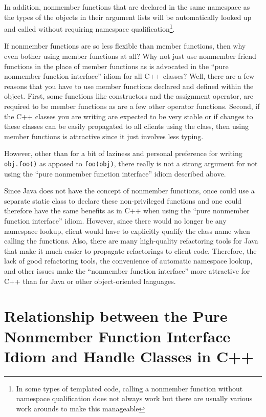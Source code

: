 \documentclass[pdf,ps2pdf,11pt]{SANDreport}
\begin{document}
In addition, nonmember functions that are declared in the same namespace as
the types of the objects in their argument lists will be automatically looked
up and called without requiring namespace qualification\footnote{In some types
of templated code, calling a nonmember function without namespace
qualification does not always work but there are usually various work arounds
to make this manageable}.

If nonmember functions are so less flexible than member functions, then why
even bother using member functions at all?  Why not just use nonmember friend
functions in the place of member functions as is advocated in the ``pure
nonmember function interface'' idiom for all C++ classes?  Well, there are a
few reasons that you have to use member functions declared and defined within
the object.  First, some functions like constructors and the assignment
operator, are required to be member functions as are a few other operator
functions.  Second, if the C++ classes you are writing are expected to be very
stable or if changes to these classes can be easily propagated to all clients
using the class, then using member functions is attractive since it just
involves less typing.

However, other than for a bit of laziness and personal preference for writing
{}\texttt{obj.foo()} as apposed to {}\texttt{foo(obj)}, there really is not a
strong argument for not using the ``pure nonmember function interface'' idiom
described above.

Since Java does not have the concept of nonmember functions, once could use a
separate static class to declare these non-privileged functions and one could
therefore have the same benefits as in C++ when using the ``pure nonmember
function interface'' idiom.  However, since there would no longer be any
namespace lookup, client would have to explicitly qualify the class name when
calling the functions.  Also, there are many high-quality refactoring tools
for Java that make it much easier to propagate refactorings to client code.
Therefore, the lack of good refactoring tools, the convenience of automatic
namespace lookup, and other issues make the ``nonmember function interface''
more attractive for C++ than for Java or other object-oriented languages.

%
\section{Relationship between the Pure Nonmember Function Interface Idiom and Handle Classes in C++}
%
\end{document}
